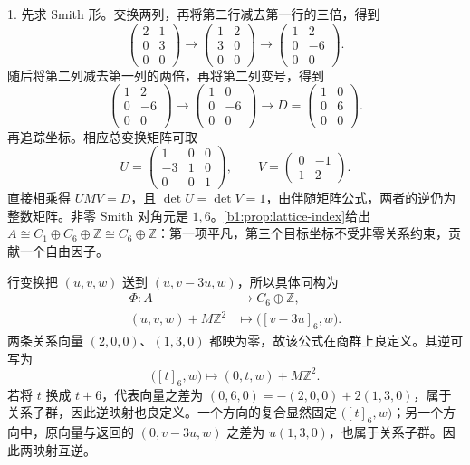 \begin{solution}
	1. 先求 Smith 形。交换两列，再将第二行减去第一行的三倍，得到
	\[
		\begin{pmatrix}2&1\\0&3\\0&0\end{pmatrix}
		\longrightarrow
		\begin{pmatrix}1&2\\3&0\\0&0\end{pmatrix}
		\longrightarrow
		\begin{pmatrix}1&2\\0&-6\\0&0\end{pmatrix}.
	\]
	随后将第二列减去第一列的两倍，再将第二列变号，得到
	\[
		\begin{pmatrix}1&2\\0&-6\\0&0\end{pmatrix}
		\longrightarrow
		\begin{pmatrix}1&0\\0&-6\\0&0\end{pmatrix}
		\longrightarrow
		D=\begin{pmatrix}1&0\\0&6\\0&0\end{pmatrix}.
	\]
	再追踪坐标。相应总变换矩阵可取
	\[
		U=\begin{pmatrix}1&0&0\\-3&1&0\\0&0&1\end{pmatrix},\qquad
		V=\begin{pmatrix}0&-1\\1&2\end{pmatrix}.
	\]
	直接相乘得 \(UMV=D\)，且 \(\det U=\det V=1\)，由伴随矩阵公式，两者的逆仍为整数矩阵。非零 Smith 对角元是 \(1,6\)。\cref{b1:prop:lattice-index}给出 \(A\cong C_1\oplus C_6\oplus\mathbb Z\cong C_6\oplus\mathbb Z\)：第一项平凡，第三个目标坐标不受非零关系约束，贡献一个自由因子。

	行变换把 \((u,v,w)\) 送到 \((u,v-3u,w)\)，所以具体同构为
	\[
		\begin{aligned}
			\Phi:A&\longrightarrow C_6\oplus\mathbb Z,\\
			(u,v,w)+M\mathbb Z^2&\longmapsto\bigl([v-3u]_6,w\bigr).
		\end{aligned}
	\]
	两条关系向量 \((2,0,0)\)、\((1,3,0)\) 都映为零，故该公式在商群上良定义。其逆可写为
	\[
		\bigl([t]_6,w\bigr)\longmapsto(0,t,w)+M\mathbb Z^2.
	\]
	若将 \(t\) 换成 \(t+6\)，代表向量之差为 \((0,6,0)=-(2,0,0)+2(1,3,0)\)，属于关系子群，因此逆映射也良定义。一个方向的复合显然固定 \(\bigl([t]_6,w\bigr)\)；另一个方向中，原向量与返回的 \((0,v-3u,w)\) 之差为 \(u(1,3,0)\)，也属于关系子群。因此两映射互逆。


\end{solution}
